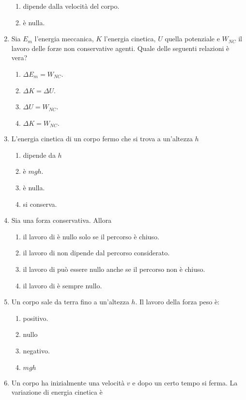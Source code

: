 \documentclass{article}
\begin{document}
\begin{enumerate}
\begin{enumerate}[label=\Alph*.]
    \item dipende dalla velocità del corpo.
    \item è nulla.
  \end{enumerate}
  \item Sia $E_m$ l'energia meccanica, $K$ l'energia cinetica, $U$ quella potenziale e $W_{NC}$ il lavoro delle forze non conservative agenti. Quale delle seguenti relazioni è vera?
  \begin{enumerate}[label=\Alph*.]
    \item $\Delta E_m=W_{NC}$.
    \item $\Delta K = \Delta U$.
    \item $\Delta U=W_{NC}$.
    \item $\Delta K=W_{NC}.$
  \end{enumerate}
  \item L'energia cinetica di un corpo fermo che si trova a un'altezza $h$
  \begin{enumerate}[label=\Alph*.]
    \item dipende da $h$
    \item è $mgh$.
    \item è nulla.
    \item si conserva.
  \end{enumerate}
  \item Sia  una forza conservativa. Allora
  \begin{enumerate}[label=\Alph*.]
    \item il lavoro di  è nullo solo se il percorso è chiuso.
    \item il lavoro di  non dipende dal percorso considerato.
    \item il lavoro di  può essere nullo anche se il percorso non è chiuso.
    \item il lavoro di  è sempre nullo.
  \end{enumerate}
  \item Un corpo sale da terra fino a un'altezza $h$. Il lavoro della forza peso è:
  \begin{enumerate}[label=\Alph*.]
    \item positivo.
    \item nullo
    \item negativo.
    \item $mgh$
  \end{enumerate}
  \item Un corpo ha inizialmente una velocità $v$ e dopo un certo tempo si ferma. La variazione di energia cinetica è

\end{enumerate}
\end{document}
